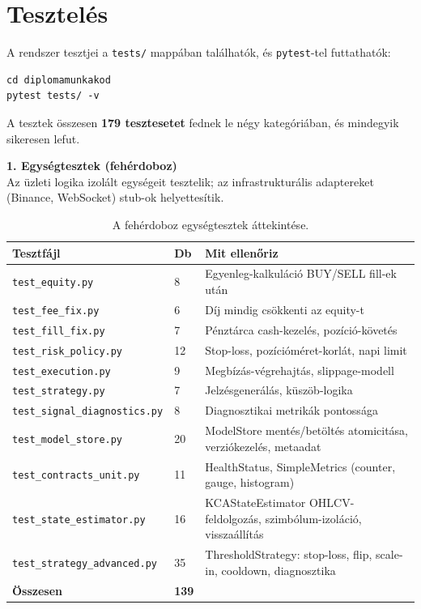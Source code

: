 \section{Tesztelés}
\label{sec:testing}

A rendszer tesztjei a \texttt{tests/} mappában találhatók, és
\texttt{pytest}-tel futtathatók:

\begin{verbatim}
cd diplomamunkakod
pytest tests/ -v
\end{verbatim}

A tesztek összesen \textbf{179 tesztesetet} fednek le négy
kategóriában, és mindegyik sikeresen lefut.

\noindent\textbf{1. Egységtesztek (fehérdoboz)}\\
Az üzleti logika izolált egységeit tesztelik; az infrastrukturális
adaptereket (Binance, WebSocket) stub-ok helyettesítik.

\begin{table}[H]
  \centering
  \small
  \begin{tabular}{|p{4.8cm}|l|p{6.7cm}|}
    \hline
    \textbf{Tesztfájl} & \textbf{Db} & \textbf{Mit ellenőriz} \\
    \hline\hline
    \texttt{test\_equity.py}           & 8  & Egyenleg-kalkuláció BUY/SELL fill-ek után \\
    \texttt{test\_fee\_fix.py}          & 6  & Díj mindig csökkenti az equity-t \\
    \texttt{test\_fill\_fix.py}         & 7  & Pénztárca cash-kezelés, pozíció-követés \\
    \texttt{test\_risk\_policy.py}      & 12 & Stop-loss, pozícióméret-korlát, napi limit \\
    \texttt{test\_execution.py}        & 9  & Megbízás-végrehajtás, slippage-modell \\
    \texttt{test\_strategy.py}         & 7  & Jelzésgenerálás, küszöb-logika \\
    \texttt{test\_signal\_diagnostics.py} & 8 & Diagnosztikai metrikák pontossága \\
    \texttt{test\_model\_store.py}      & 20 & ModelStore mentés/betöltés atomicitása, verziókezelés, metaadat \\
    \texttt{test\_contracts\_unit.py}   & 11 & HealthStatus, SimpleMetrics (counter, gauge, histogram) \\
    \texttt{test\_state\_estimator.py}  & 16 & KCAStateEstimator OHLCV-feldolgozás, szimbólum-izoláció, visszaállítás \\
    \texttt{test\_strategy\_advanced.py}& 35 & ThresholdStrategy: stop-loss, flip, scale-in, cooldown, diagnosztika \\
    \hline
    \textbf{Összesen} & \textbf{139} & \\
    \hline
  \end{tabular}
  \caption{A fehérdoboz egységtesztek áttekintése.}
  \label{tab:unit_tests}
\end{table}

